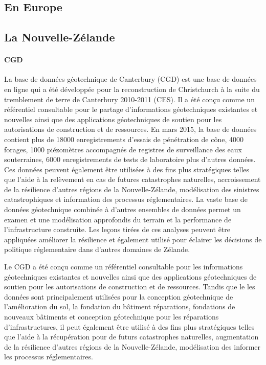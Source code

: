         \subsection{En Europe}
        \cite{antoljak2012subsurface}
       
        \lipsum[1]
        \subsection{La Nouvelle-Zélande}
        \paragraph{CGD}
        La base de données géotechnique de Canterbury (CGD) est une base de données en ligne qui a été développée pour
        la reconstruction de Christchurch à la suite du tremblement de terre de Canterbury 2010-2011 (CES). Il
        a été conçu comme un référentiel consultable pour le partage d'informations géotechniques existantes et nouvelles
        ainsi que des applications géotechniques de soutien pour les autorisations de construction et de ressources. En mars
        2015, la base de données contient plus de 18000 enregistrements d'essais de pénétration de cône, 4000 forages, 1000
        piézomètres accompagnés de registres de surveillance des eaux souterraines, 6000 enregistrements de tests de laboratoire
        plus d'autres données. Ces données peuvent également être utilisées à des fins plus stratégiques telles que l'aide à la
        relèvement en cas de futures catastrophes naturelles, accroissement de la résilience d'autres régions de la Nouvelle-Zélande,
        modélisation des sinistres catastrophiques et information des processus réglementaires. La vaste base de données géotechnique
        combinée à d'autres ensembles de données permet un examen et une modélisation approfondis du terrain
        et la performance de l'infrastructure construite. Les leçons tirées de ces analyses peuvent être appliquées
        améliorer la résilience et également utilisé pour éclairer les décisions de politique réglementaire dans d'autres domaines de
        Zélande.
        \par
        Le CGD a été conçu comme un référentiel consultable pour les informations géotechniques existantes et nouvelles
        ainsi que des applications géotechniques de soutien pour les autorisations de construction et de ressources. Tandis que le
        les données sont principalement utilisées pour la conception géotechnique de l'amélioration du sol, la fondation du bâtiment
        réparations, fondations de nouveaux bâtiments et conception géotechnique pour les réparations d'infrastructures, il peut
        également être utilisé à des fins plus stratégiques telles que l'aide à la récupération pour de futurs
        catastrophes naturelles, augmentation de la résilience d'autres régions de la Nouvelle-Zélande, modélisation des
        informer les processus réglementaires.
        \cite{cgd}


